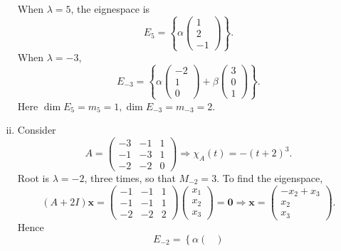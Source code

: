 \documentclass[a4paper]{article}
\begin{document}
\begin{example}
\begin{enumerate}[(i)]
          When $ \lambda=5 $, the eignespace is
          \[
            E_5=\left\{ \alpha
              \begin{pmatrix}
                1\\2\\-1
            \end{pmatrix} \right\}
          .\]
          When $ \lambda=-3 $,
          \[
            E_{-3}=\left\{ \alpha
              \begin{pmatrix}
                -2\\1\\0
              \end{pmatrix}+\beta
              \begin{pmatrix}
                3\\0\\1
            \end{pmatrix} \right\}
          .\]
          Here $ \dim E_5 = m_5=1, \dim E_{-3}=m_{-3}=2 $.
        \item Consider
          \[
            A=
            \begin{pmatrix}
              -3&-1&1\\
              -1&-3&1\\
              -2&-2&0
            \end{pmatrix}
            \Longrightarrow
            \chi_A(t)=-(t+2)^3
          .\]
          Root is $ \lambda=-2 $, three times, so that $ M_{-2}=3 $.
          To find the eigenspace,
          \[
            (A+2 I) \mathbf{x}=\left(
              \begin{array}{rrr}
                -1 & -1 & 1 \\
                -1 & -1 & 1 \\
                -2 & -2 & 2
            \end{array}\right)\left(
              \begin{array}{l}
                x_{1} \\
                x_{2} \\
                x_{3}
            \end{array}\right)=\mathbf{0} \Longrightarrow \mathbf{x}=
            \begin{pmatrix}
              -x_2+x_3\\x_2\\x_3
            \end{pmatrix}
          .\]
          Hence
          \[
            E_{-2}=\left\{ \alpha
              \begin{pmatrix}

\end{pmatrix}\]
\end{enumerate}
\end{example}
\end{document}
